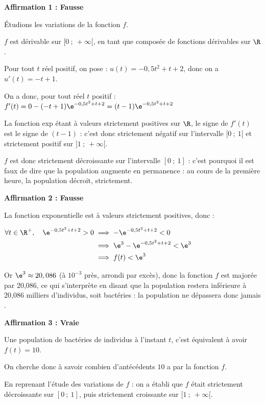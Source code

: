 \bigskip

\textbf{Affirmation 1 : Fausse}

Étudions les variations de la fonction $f$.

$f$ est dérivable sur $ [0~;~+\infty[ $, en tant que composée de fonctions dérivables sur $\R$.

Pour tout $t$ réel positif, on pose : $u(t) = -0,5t^2 + t+2$, donc on a $u'(t) = -t + 1$.

On a donc, pour tout réel $t$ positif : $f'(t) = 0 - (-t + 1)\e^{-0,5t^2 + t + 2} = (t-1)\e^{-0,5t^2 + t + 2} $

La fonction exp étant à valeurs strictement positives sur $\R$, le signe de $f'(t)$ est le signe de $(t-1)$ : c'est donc strictement négatif sur l'intervalle $ [0~;~1[ $ et strictement positif sur $ ]1~;~+\infty[ $.

$f$ est donc strictement décroissante sur l'intervalle $[ 0~;~1]$ : c'est pourquoi il est faux de dire que la population augmente en permanence : au cours de la première heure, la population décroit, strictement.

\medskip
\textbf{Affirmation 2 : Fausse}

La fonction exponentielle est à valeurs strictement positives, donc :

$\begin{aligned} \forall t \in \R^+, \quad \e^{-0,5t^2 + t + 2} > 0 &\implies -\e^{-0,5t^2 + t + 2}<0\\
&\implies \e^3-\e^{-0,5t^2 + t + 2}<\e^3\\
&\implies f(t) < \e^3\\ \end{aligned}$

Or $\e^3 \approx 20,086$ (à $ 10^{-3} $ près, arrondi par excès), donc la fonction $f$ est majorée par 20,086, ce qui s'interprète en disant que la population restera inférieure à 20,086 milliers d'individus, soit  bactéries : la population ne dépassera donc jamais .

\medskip

\textbf{Affirmation 3 : Vraie}

Une population de bactéries de  individus à l'instant $t$, c'est équivalent à avoir $f(t) = 10$.

On cherche donc à savoir combien d'antécédents $10$ a par la fonction $f$.

En reprenant l'étude des variations de $f$ : on a établi que $f$ était strictement décroissante sur $[0~;~1]$, puis strictement croissante sur $ [1~;~+\infty[ $.

